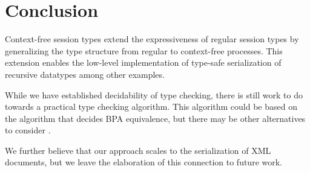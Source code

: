 \section{Conclusion}
\label{sec:conclusion}

Context-free session types extend the expressiveness of regular
session types by generalizing the type structure from
regular to context-free processes. This extension enables
the low-level implementation of type-safe serialization of recursive datatypes
among other examples. 

While we have established decidability of type checking, there
is still work to do towards a practical type checking
algorithm. This algorithm could be based on the algorithm that decides
BPA equivalence, but there may be other alternatives to consider \cite{DBLP:journals/iandc/LanesePSS11}.

We further believe that our approach scales to the serialization of XML
documents, but we leave the elaboration of this connection to future work.






